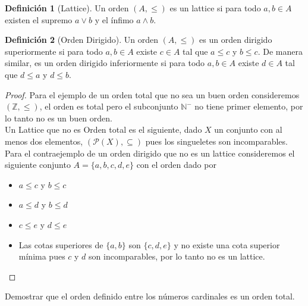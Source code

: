 \documentclass{article}
\theoremstyle{definition}
\newtheorem{definition}{Definición}[section]
\newcommand{\Z}{\mathbb{Z}}
\newcommand{\N}{\mathbb{N}}
\newenvironment{ejercicio}[1]{\begin{trivlist}
\item[\hskip \labelsep {\bfseries Ejercicio}\hskip \labelsep {\bfseries #1.}]}{\end{trivlist}}
\begin{document}
\begin{definition}[Lattice]
    Un orden \( (A, \leq) \) es un lattice si para todo \( a, b \in A \) existen el supremo \( a \vee b \) y el ínfimo \( a \wedge b \).
\end{definition}

\begin{definition}[Orden Dirigido]
    Un orden \( (A, \leq) \) es un orden dirigido superiormente si para todo \( a, b \in A \) existe \( c \in A \) tal que \( a \leq c \) y \( b \leq c \). De manera similar, es un orden dirigido inferiormente si para todo \( a, b \in A \) existe \( d \in A \) tal que \( d \leq a \) y \( d \leq b \).
\end{definition}

\begin{proof}
    Para el ejemplo de un orden total que no sea un buen orden consideremos \( (\Z, \leq) \), el orden es total pero el subconjunto \( \N^- \) no tiene primer elemento, por lo tanto no es un buen orden. \\
    Un Lattice que no es Orden total es el siguiente, dado \( X \) un conjunto con al menos dos elementos, \( (\mathcal{P}(X), \subseteq) \) pues los singueletes son incomparables. \\
    Para el contraejemplo de un orden dirigido que no es un lattice consideremos el siguiente conjunto \( A = \{ a, b, c, d, e \} \) con el orden dado por \begin{itemize}
        \item \( a \leq c \) y \( b \leq c \)
        \item \( a \leq d \) y \( b \leq d \)
        \item \( c \leq e \) y \( d \leq e \)
        \item Las cotas superiores de \( \{ a, b \} \) son \( \{ c, d, e \} \) y no existe una cota superior mínima pues \( c \) y \( d \) son incomparables, por lo tanto no es un lattice.
    \end{itemize}
\end{proof}

\begin{ejercicio}{9}
    Demostrar que el orden definido entre los números cardinales es un orden total.
\end{ejercicio}
\end{document}
